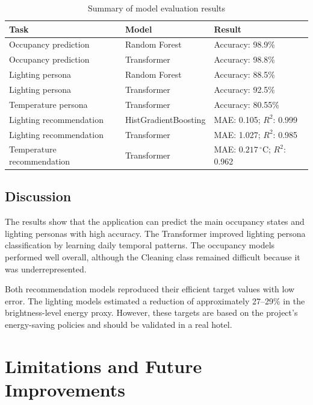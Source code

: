 \begin{table}[htbp]
\centering
\caption{Summary of model evaluation results}
\label{tab:project-model-results}
\begin{tabular}{|p{4.0cm}|p{3.6cm}|p{5.0cm}|}
\hline
\textbf{Task} & \textbf{Model} & \textbf{Result} \\ \hline
Occupancy prediction & Random Forest &
Accuracy: 98.9\% \\ \hline
Occupancy prediction & Transformer &
Accuracy: 98.8\% \\ \hline
Lighting persona & Random Forest &
Accuracy: 88.5\% \\ \hline
Lighting persona & Transformer &
Accuracy: 92.5\% \\ \hline
Temperature persona & Transformer &
Accuracy: 80.55\% \\ \hline
Lighting recommendation & HistGradientBoosting &
MAE: 0.105; $R^2$: 0.999 \\ \hline
Lighting recommendation & Transformer &
MAE: 1.027; $R^2$: 0.985 \\ \hline
Temperature recommendation & Transformer &
MAE: $0.217\,^{\circ}\mathrm{C}$; $R^2$: 0.962 \\ \hline
\end{tabular}
\end{table}

\section{Discussion}

The results show that the application can predict the main occupancy states
and lighting personas with high accuracy. The Transformer improved lighting
persona classification by learning daily temporal patterns. The occupancy
models performed well overall, although the Cleaning class remained difficult
because it was underrepresented.

Both recommendation models reproduced their efficient target values with low
error. The lighting models estimated a reduction of approximately 27--29\% in
the brightness-level energy proxy. However, these targets are based on the
project's energy-saving policies and should be validated in a real hotel.


\chapter{Limitations and Future Improvements}
\label{chap:limitations}

